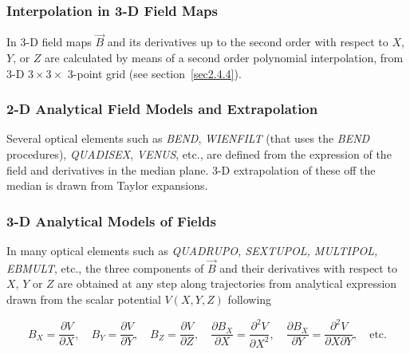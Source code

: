 \subsubsection[Interpolation in 3-D Field Maps]%
        {Interpolation in 3-D Field Maps~\protect\cite{Biblio4}}
           \label{sec2.3.4} %

In 3-D field maps $ \vec  B $ and its derivatives up to the second
order with respect to $ X$, $Y$,  or $ Z $ are calculated by means of a second order polynomial 
interpolation,  from  3-D  $ 3  \times  3 
 \times $ 3-point grid (see section~\ref{sec2.4.4}). 




\subsubsection{2-D Analytical Field Models and Extrapolation} 

Several optical elements such as \textsl{BEND}, \textsl{WIENFILT} (that 
uses the \textsl{BEND} procedures), \textsl{QUADISEX}, \textsl{VENUS}, etc., 
are defined from the  expression of the field and derivatives in the median plane. 
3-D extrapolation of these off the median is drawn from Taylor expansions. 





 
\subsubsection{3-D Analytical Models of Fields} \label{sec2.3.5} 

In many optical elements such as \textsl{QUADRUPO, SEXTUPOL, 
MULTIPOL, EBMULT},  etc.,  the three 
components of $ \vec  B $  and their derivatives with respect to $ X$, $Y $ 
or $ Z $ are obtained at any step along trajectories from analytical 
expression drawn from the scalar potential $ V(X,Y,Z) $ following 

 \begin{equation}
	 	 B_X = \dfrac{\partial V}{\partial X}, 
	 	    \quad B_Y = \dfrac{\partial V }{ \partial Y}, 
	 	     \quad B_Z = \dfrac{\partial V }{ \partial Z}, 
	 	  \quad \dfrac{\partial B_X }{ \partial X} = \dfrac{\partial^2V}{\partial X^2},
	 	     \quad \dfrac{\partial B_X}{\partial Y} 
	 	               = \dfrac{\partial^2V}{\partial X\partial Y},
	 	    \quad\text{etc.}
 	\label{eq2-3-4}
 \end{equation}

